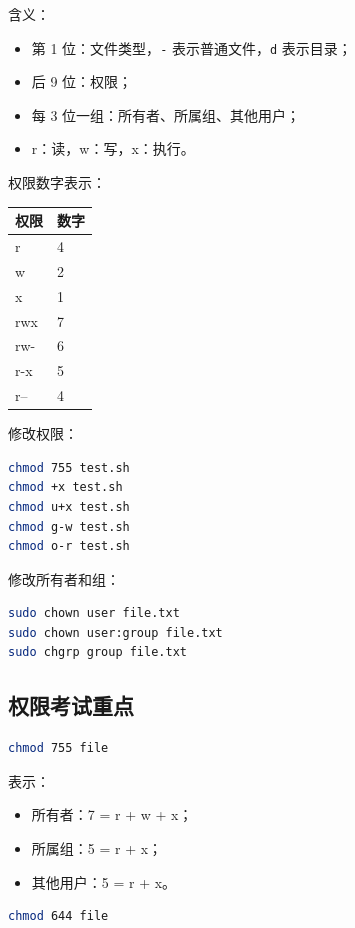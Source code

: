 \documentclass[UTF8,a4paper,12pt]{ctexart}
\begin{document}
含义：
\begin{itemize}
    \item 第 1 位：文件类型，\texttt{-} 表示普通文件，\texttt{d} 表示目录；
    \item 后 9 位：权限；
    \item 每 3 位一组：所有者、所属组、其他用户；
    \item r：读，w：写，x：执行。
\end{itemize}

权限数字表示：

\begin{longtable}{p{4cm}p{4cm}}
\toprule
权限 & 数字 \\
\midrule
r & 4 \\
w & 2 \\
x & 1 \\
rwx & 7 \\
rw- & 6 \\
r-x & 5 \\
r-- & 4 \\
\bottomrule
\end{longtable}

修改权限：

\begin{lstlisting}[language=bash]
chmod 755 test.sh
chmod +x test.sh
chmod u+x test.sh
chmod g-w test.sh
chmod o-r test.sh
\end{lstlisting}

修改所有者和组：

\begin{lstlisting}[language=bash]
sudo chown user file.txt
sudo chown user:group file.txt
sudo chgrp group file.txt
\end{lstlisting}

\subsection{权限考试重点}

\begin{lstlisting}[language=bash]
chmod 755 file
\end{lstlisting}

表示：
\begin{itemize}
    \item 所有者：7 = r + w + x；
    \item 所属组：5 = r + x；
    \item 其他用户：5 = r + x。
\end{itemize}

\begin{lstlisting}[language=bash]
chmod 644 file
\end{lstlisting}
\end{document}

